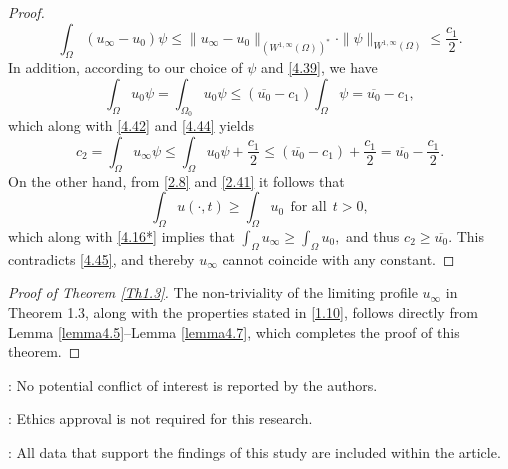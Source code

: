 \documentclass[12pt]{article}
\theoremstyle{plain}
\theoremstyle{definition}
\numberwithin{equation}{section}
\begin{document}
\begin{proof}
\begin{equation}
      \int_{\Omega}(u_{\infty}-u_0)\psi\leq\|u_{\infty}-u_0\|_{(W^{1,\infty}(\Omega))^*}
      \cdot\|\psi\|_{W^{1,\infty}(\Omega)}\leq \frac{c_1}{2}.
      \end{equation}
      In addition, according to our choice of $\psi$ and \eqref{4.39}, we have
      \begin{equation*}
      \int_\Omega u_0\psi=\int_{\Omega_0} u_0\psi\leq (\overline{u_0}-c_1)\int_\Omega \psi=\overline{u_0}-c_1,
      \end{equation*}
     which along with \eqref{4.42} and \eqref{4.44} yields
      \begin{equation}\label{4.45}
      c_2=\int_\Omega u_{\infty}\psi\leq\int_\Omega u_0\psi+\frac{c_1}{2}
      \leq(\overline{u_0}-c_1)+\frac{c_1}2
      =\overline{u_0}-\frac{c_1}2.
      \end{equation}
      On the other hand, from \eqref{2.8} and \eqref{2.41} it follows that
      \begin{equation*}
      \int_\Omega u(\cdot,t)\geq\int_\Omega u_0~~\mbox{for all}~~t>0,
      \end{equation*}
which along with \eqref{4.16*} implies that
$      \int_\Omega u_{\infty}\geq\int_\Omega u_0,
      $
      and thus
      $
      c_2\geq\overline{u_0}
      $.
This contradicts \eqref{4.45}, and thereby  $u_{\infty}$
 cannot coincide with any constant.
\end{proof}
\begin{proof}[Proof of Theorem \ref{Th1.3}] The non-triviality of the limiting profile $u_\infty$ in Theorem 1.3,
 along with the properties stated in \eqref{1.10},  follows directly from Lemma \ref{lemma4.5}--Lemma \ref{lemma4.7}, which completes the proof of this theorem.
\end{proof}

\vspace{.3cm}

:
No potential conflict of interest is reported by the authors.

:
Ethics approval is not required for this research.


:
All data that support the findings of this study are included within the article. %
\end{document}
